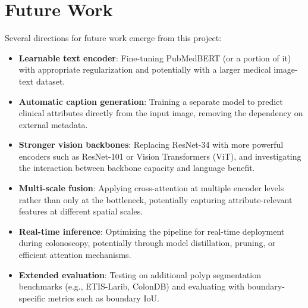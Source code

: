 \section{Future Work}
\label{sec:concl:future}

Several directions for future work emerge from this project:

\begin{itemize}
	\item \textbf{Learnable text encoder}: Fine-tuning PubMedBERT (or a portion of it) with appropriate regularization and potentially with a larger medical image-text dataset.
	
	\item \textbf{Automatic caption generation}: Training a separate model to predict clinical attributes directly from the input image, removing the dependency on external metadata.
	
	\item \textbf{Stronger vision backbones}: Replacing ResNet-34 with more powerful encoders such as ResNet-101 or Vision Transformers (ViT), and investigating the interaction between backbone capacity and language benefit.
	
	\item \textbf{Multi-scale fusion}: Applying cross-attention at multiple encoder levels rather than only at the bottleneck, potentially capturing attribute-relevant features at different spatial scales.
	
	\item \textbf{Real-time inference}: Optimizing the pipeline for real-time deployment during colonoscopy, potentially through model distillation, pruning, or efficient attention mechanisms.
	
	\item \textbf{Extended evaluation}: Testing on additional polyp segmentation benchmarks (e.g., ETIS-Larib, ColonDB) and evaluating with boundary-specific metrics such as boundary IoU.
\end{itemize}
